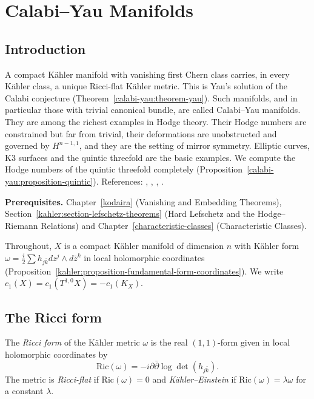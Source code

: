 \chapter{Calabi--Yau Manifolds}\label{calabi-yau}

\section{Introduction}\label{calabi-yau:section-introduction}

A compact K\"ahler manifold with vanishing first Chern class carries, in every K\"ahler class, a unique Ricci-flat K\"ahler metric. This is Yau's solution of
the Calabi conjecture (Theorem~\ref{calabi-yau:theorem-yau}). Such manifolds, and in particular those with trivial canonical bundle, are called Calabi--Yau
manifolds. They are among the richest examples in Hodge theory. Their Hodge numbers are constrained but far from trivial, their deformations are unobstructed
and governed by $H^{n-1,1}$, and they are the setting of mirror symmetry. Elliptic curves, K3 surfaces and the quintic threefold are the basic examples. We
compute the Hodge numbers of the quintic threefold completely (Proposition~\ref{calabi-yau:proposition-quintic}). References: \cite{gross-huybrechts-joyce},
\cite[Chapter 6]{joyce-special-holonomy}, \cite{yau-1978}, \cite{beauville-1983}.

\noindent\textbf{Prerequisites.} Chapter~\ref{kodaira} (Vanishing and Embedding Theorems), Section~\ref{kahler:section-lefschetz-theorems} (Hard Lefschetz and the
Hodge--Riemann Relations) and Chapter~\ref{characteristic-classes} (Characteristic Classes).

Throughout, $X$ is a compact K\"ahler manifold of dimension $n$ with K\"ahler form $\omega = \frac{i}{2}\sum h_{j\bar k}dz^j \wedge d\bar z^k$ in local holomorphic
coordinates (Proposition~\ref{kahler:proposition-fundamental-form-coordinates}). We write $c_1(X) = c_1(T^{1,0}X) = -c_1(K_X)$.

\section{The Ricci form}\label{calabi-yau:section-ricci}

\begin{definition}\label{calabi-yau:definition-ricci-form}
The \emph{Ricci form} of the K\"ahler metric $\omega$ is the real $(1,1)$-form given in local holomorphic coordinates by
\[
\mathrm{Ric}(\omega) = -i\partial\bar\partial\log\det(h_{j\bar k}) .
\]
The metric is \emph{Ricci-flat} if $\mathrm{Ric}(\omega) = 0$ and \emph{K\"ahler--Einstein} if $\mathrm{Ric}(\omega) = \lambda\omega$ for a constant $\lambda$.
\end{definition}

